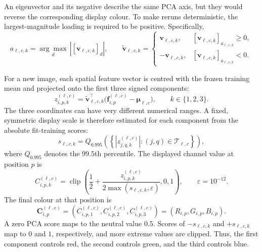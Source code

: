 An eigenvector and its negative describe the same PCA axis, but they would
reverse the corresponding display colour. To make reruns deterministic, the
largest-magnitude loading is required to be positive. Specifically,
\begin{equation}
    a_{\ell,c,k}
    =
    \underset{d}{\arg\max}\,
    \left|[\bm v_{\ell,c,k}]_d\right|,
    \qquad
    \widetilde{\bm v}_{\ell,c,k}
    =
    \begin{cases}
        \bm v_{\ell,c,k},
        & [\bm v_{\ell,c,k}]_{a_{\ell,c,k}}\geq 0,\\
        -\bm v_{\ell,c,k},
        & [\bm v_{\ell,c,k}]_{a_{\ell,c,k}}<0.
    \end{cases}
    \label{eq:pca-sign-fixing}
\end{equation}

For a new image, each spatial feature vector is centred with the frozen
training mean and projected onto the first three signed components:
\begin{equation}
    z^{(\ell,c)}_{i,p,k}
    =
    \widetilde{\bm v}_{\ell,c,k}^{\top}
    \bigl(\bm f^{(\ell,c)}_{i,p}-\bm\mu_{\ell,c}\bigr),
    \qquad k\in\{1,2,3\}.
    \label{eq:pca-coordinate}
\end{equation}
The three coordinates can have very different numerical ranges. A fixed,
symmetric display scale is therefore estimated for each component from the
absolute fit-training scores:
\begin{equation}
    s_{\ell,c,k}
    =
    Q_{0.995}
    \left(
        \left\{
        \left|z^{(\ell,c)}_{j,q,k}\right|
        :(j,q)\in\mathcal T_{\ell,c}
        \right\}
    \right),
    \label{eq:pca-display-scale}
\end{equation}
where $Q_{0.995}$ denotes the $99.5$th percentile. The displayed channel value
at position $p$ is
\begin{equation}
    C^{(\ell,c)}_{i,p,k}
    =
    \operatorname{clip}
    \left(
        \frac{1}{2}
        +
        \frac{z^{(\ell,c)}_{i,p,k}}
             {2\max(s_{\ell,c,k},\varepsilon)},
        0,1
    \right),
    \qquad
    \varepsilon=10^{-12}.
    \label{eq:pca-rgb-channel}
\end{equation}
The final colour at that position is
\begin{equation}
    \bm C^{(\ell,c)}_{i,p}
    =
    \left(
        C^{(\ell,c)}_{i,p,1},
        C^{(\ell,c)}_{i,p,2},
        C^{(\ell,c)}_{i,p,3}
    \right)
    =
    (R_{i,p},G_{i,p},B_{i,p}).
    \label{eq:pca-rgb}
\end{equation}
A zero PCA score maps to the neutral value $0.5$. Scores of
$-s_{\ell,c,k}$ and $+s_{\ell,c,k}$ map to $0$ and $1$, respectively, and more
extreme values are clipped. Thus, the first component controls red, the second
controls green, and the third controls blue.

